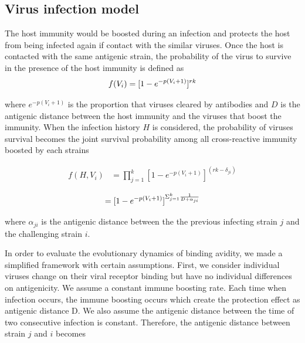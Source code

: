 \documentclass{article}
\begin{document}
\subsection{Virus infection model}

The host immunity would be boosted during an infection and protects the host from being infected again if contact with the similar viruses. Once the host is contacted with the same antigenic strain, the probability of the virus to survive in the presence of the host immunity is defined as
\begin{equation}
    \label{simple_equation}
    f(V_{i}) = [1-e^{-p(V_{i}+1)}]^{rk} \\
\end{equation}

where $e^{-p(V_{i}+1)}$ is the proportion that viruses cleared by antibodies and $D$ is the antigenic distance between the host immunity and the viruses that boost the immunity. When the infection history $H$ is considered, the probability of viruses survival becomes the joint survival probability among all cross-reactive immunity boosted by each strains

\begin{equation}
    \label{simple_equation}
    \begin{split}
    f(H,V_{i}) &= \prod_{j=1}^{k} [1-e^{-p(V_{i}+1)}]^{(rk-\delta_{ji})} \\
    \end{split}
\end{equation}
\begin{equation}
\space = [1-e^{-p(V_{i}+1)}]^{\Sigma_{j=1}^{k}\frac{1}{D+\alpha_{ji}}} \\
\end{equation}

where $\alpha_{ji}$ is the antigenic distance between the the previous infecting strain $j$ and the challenging strain $i$.

In order to evaluate the evolutionary dynamics of binding avidity, we made a simplified framework with certain assumptions. First, we consider individual viruses change on their viral receptor binding but have no individual differences on antigenicity. We assume a constant immune boosting rate. Each time when infection occurs, the immune boosting occurs which create the protection effect as antigenic distance D. We also assume the antigenic distance between the time of two consecutive infection is constant. Therefore, the antigenic distance between strain $j$ and $i$ becomes
\end{document}
